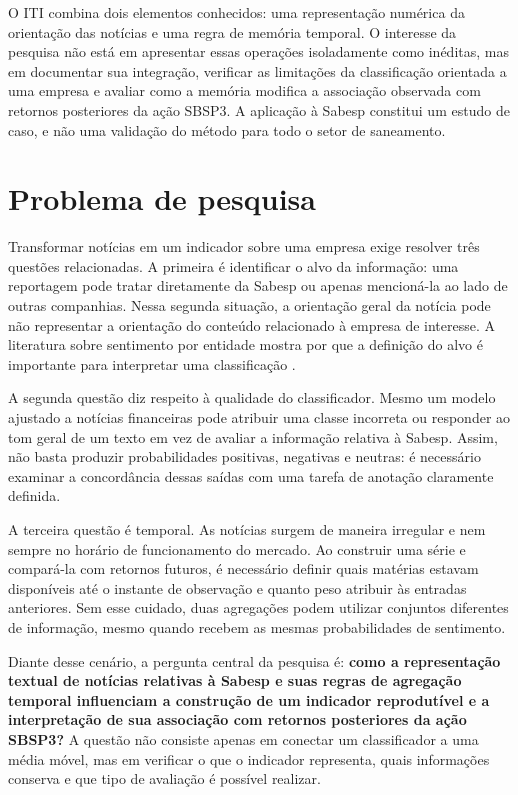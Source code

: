 O ITI combina dois elementos conhecidos: uma representação numérica da orientação das notícias e uma regra de memória temporal. O interesse da pesquisa não está em apresentar essas operações isoladamente como inéditas, mas em documentar sua integração, verificar as limitações da classificação orientada a uma empresa e avaliar como a memória modifica a associação observada com retornos posteriores da ação SBSP3. A aplicação à Sabesp constitui um estudo de caso, e não uma validação do método para todo o setor de saneamento.

\section{Problema de pesquisa}
\label{sec:problema}

Transformar notícias em um indicador sobre uma empresa exige resolver três questões relacionadas. A primeira é identificar o alvo da informação: uma reportagem pode tratar diretamente da Sabesp ou apenas mencioná-la ao lado de outras companhias. Nessa segunda situação, a orientação geral da notícia pode não representar a orientação do conteúdo relacionado à empresa de interesse. A literatura sobre sentimento por entidade mostra por que a definição do alvo é importante para interpretar uma classificação \cite{yuan2020target,sinha2022sentfin}.

A segunda questão diz respeito à qualidade do classificador. Mesmo um modelo ajustado a notícias financeiras pode atribuir uma classe incorreta ou responder ao tom geral de um texto em vez de avaliar a informação relativa à Sabesp. Assim, não basta produzir probabilidades positivas, negativas e neutras: é necessário examinar a concordância dessas saídas com uma tarefa de anotação claramente definida.

A terceira questão é temporal. As notícias surgem de maneira irregular e nem sempre no horário de funcionamento do mercado. Ao construir uma série e compará-la com retornos futuros, é necessário definir quais matérias estavam disponíveis até o instante de observação e quanto peso atribuir às entradas anteriores. Sem esse cuidado, duas agregações podem utilizar conjuntos diferentes de informação, mesmo quando recebem as mesmas probabilidades de sentimento.

Diante desse cenário, a pergunta central da pesquisa é: \textbf{como a representação textual de notícias relativas à Sabesp e suas regras de agregação temporal influenciam a construção de um indicador reprodutível e a interpretação de sua associação com retornos posteriores da ação SBSP3?} A questão não consiste apenas em conectar um classificador a uma média móvel, mas em verificar o que o indicador representa, quais informações conserva e que tipo de avaliação é possível realizar.

